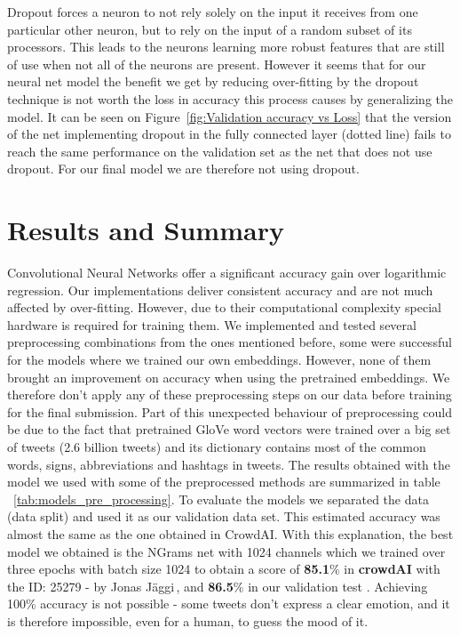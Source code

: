 \documentclass[10pt,conference,compsocconf]{IEEEtran}
\begin{document}
 Dropout forces a neuron to not rely solely on the input it receives from one particular other neuron, but to rely on the input of a random subset of its processors. This leads to the neurons learning more robust features that are still of use when not all of the neurons are present\cite{nielsen_a._1970}. However it seems that for our neural net model the benefit we get by reducing over-fitting by the dropout technique is not worth the loss in accuracy this process causes by generalizing the model. It can be seen on Figure~\ref{fig:Validation accuracy vs Loss} that the version of the net implementing dropout in the fully connected layer (dotted line) fails to reach the same performance on the validation set as the net that does not use dropout. For our final model we are therefore not using dropout.
 

\section{Results and Summary}
Convolutional Neural Networks offer a significant accuracy gain over logarithmic regression. Our implementations deliver consistent accuracy and are not much affected by over-fitting. However, due to their computational complexity special hardware is required for training them. We implemented and tested several preprocessing combinations from the ones mentioned before, some were successful for the models where we trained our own embeddings. However, none of them brought an improvement on accuracy when using the pretrained embeddings. We therefore don't apply any of these preprocessing steps on our data before training for the final submission. Part of this unexpected behaviour of preprocessing could be due to the fact that pretrained GloVe word vectors were trained over a big set of tweets (2.6 billion tweets) and its dictionary contains most of the common words, signs, abbreviations and hashtags in tweets. The results obtained with the model we used with some of the preprocessed methods are summarized in table ~\ref{tab:models_pre_processing}.
To evaluate the models we separated the data (data split) and used it as our validation data set. This estimated accuracy was almost the same as the one obtained in CrowdAI. With this explanation, the best model we obtained is the NGrams net with 1024 channels which we trained over three epochs with batch size 1024 to obtain a score of \textbf{85.1}\% in \textbf{crowdAI} with the ID: 25279 - by Jonas J\"aggi\,,  and \textbf{86.5}\% in our validation test .
Achieving 100\% accuracy is not possible - some tweets don't express a clear emotion, and it is therefore impossible, even for a human, to guess the mood of it.
\end{document}
